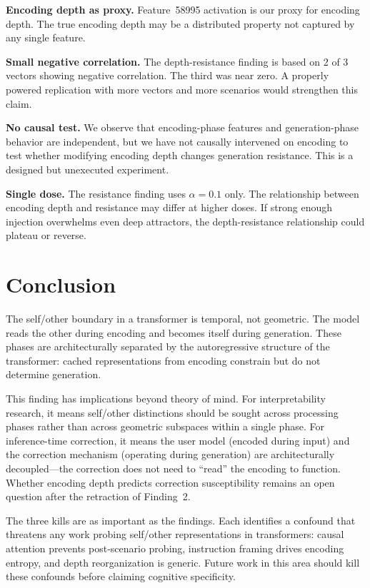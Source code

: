 \documentclass[11pt,a4paper]{article}
\begin{document}
\textbf{Encoding depth as proxy.} Feature~58995 activation is our proxy for
encoding depth. The true encoding depth may be a distributed property not
captured by any single feature.

\textbf{Small negative correlation.} The depth-resistance finding is based
on 2 of 3 vectors showing negative correlation. The third was near zero.
A properly powered replication with more vectors and more scenarios would
strengthen this claim.

\textbf{No causal test.} We observe that encoding-phase features and
generation-phase behavior are independent, but we have not causally
intervened on encoding to test whether modifying encoding depth changes
generation resistance. This is a designed but unexecuted experiment.

\textbf{Single dose.} The resistance finding uses $\alpha{=}0.1$ only.
The relationship between encoding depth and resistance may differ at
higher doses. If strong enough injection overwhelms even deep attractors,
the depth-resistance relationship could plateau or reverse.

\section{Conclusion}
\label{sec:conclusion}

The self/other boundary in a transformer is temporal, not geometric. The
model reads the other during encoding and becomes itself during generation.
These phases are architecturally separated by the autoregressive structure of
the transformer: cached representations from encoding constrain but do not
determine generation.

This finding has implications beyond theory of mind. For interpretability
research, it means self/other distinctions should be sought across
processing phases rather than across geometric subspaces within a single
phase. For inference-time correction, it means the user model (encoded
during input) and the correction mechanism (operating during generation)
are architecturally decoupled---the correction does not need to ``read''
the encoding to function. Whether encoding depth predicts correction
susceptibility remains an open question after the retraction of Finding~2.

The three kills are as important as the findings. Each identifies a confound
that threatens any work probing self/other representations in transformers:
causal attention prevents post-scenario probing, instruction framing drives
encoding entropy, and depth reorganization is generic. Future work in this
area should kill these confounds before claiming cognitive specificity.
\end{document}
